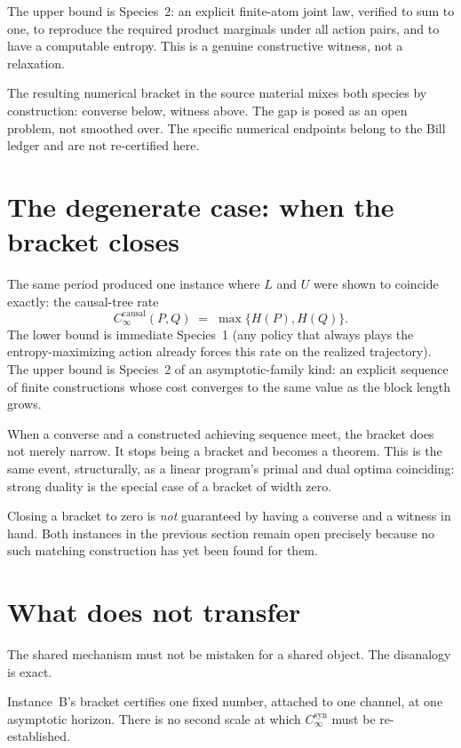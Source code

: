 \documentclass[11pt,a4paper]{article}
\begin{document}
The upper bound is Species~2: an explicit finite-atom joint law, verified to sum to one, to reproduce the required product marginals under all action pairs, and to have a computable entropy. This is a genuine constructive witness, not a relaxation.

The resulting numerical bracket in the source material mixes both species by construction: converse below, witness above. The gap is posed as an open problem, not smoothed over. The specific numerical endpoints belong to the Bill ledger and are not re-certified here.

\section{The degenerate case: when the bracket closes}

The same period produced one instance where \(L\) and \(U\) were shown to coincide exactly: the causal-tree rate
\begin{equation}
  C^{\mathrm{causal}}_\infty(P,Q)
  \;=\;
  \max\bigl\{H(P),H(Q)\bigr\}.
\end{equation}
The lower bound is immediate Species~1 (any policy that always plays the entropy-maximizing action already forces this rate on the realized trajectory). The upper bound is Species~2 of an asymptotic-family kind: an explicit sequence of finite constructions whose cost converges to the same value as the block length grows.

When a converse and a constructed achieving sequence meet, the bracket does not merely narrow. It stops being a bracket and becomes a theorem. This is the same event, structurally, as a linear program's primal and dual optima coinciding: strong duality is the special case of a bracket of width zero.

Closing a bracket to zero is \emph{not} guaranteed by having a converse and a witness in hand. Both instances in the previous section remain open precisely because no such matching construction has yet been found for them.

\section{What does not transfer}

The shared mechanism must not be mistaken for a shared object. The disanalogy is exact.

Instance~B's bracket certifies one fixed number, attached to one channel, at one asymptotic horizon. There is no second scale at which \(C^{\mathrm{syn}}_\infty\) must be re-established.
\end{document}
